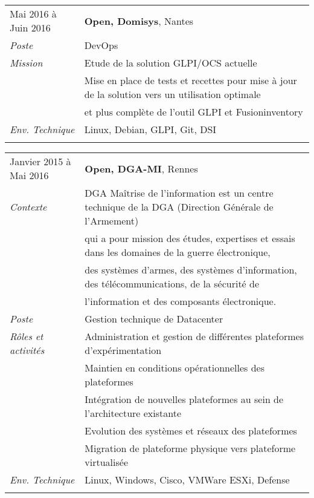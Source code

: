 \documentclass[a4paper]{article}
\begin{document}
\begin{tabular}{P{3.5cm}|p{13cm}}
Mai 2016 à Juin 2016		& \textbf{Open, Domisys}, Nantes\\
\textsl{Poste}			& DevOps\\
\textsl{Mission}		& Etude de la solution GLPI/OCS actuelle\\
				& Mise en place de tests et recettes pour mise à jour de la solution vers un utilisation optimale\\
				& et plus complète de l'outil GLPI et Fusioninventory\\
\textsl{Env. Technique}		& Linux, Debian, GLPI, Git, DSI \\
 & \\
\end{tabular}

\begin{tabular}{P{3.5cm}|p{13cm}}
Janvier 2015 à Mai 2016		& \textbf{Open, DGA-MI}, Rennes\\
\textsl{Contexte}      		& DGA Maîtrise de l'information est un centre technique de la DGA (Direction Générale de l'Armement)\\
				& qui a pour mission des études, expertises et essais dans les domaines de la guerre électronique,\\
				& des systèmes d'armes, des systèmes d'information, des télécommunications, de la sécurité de \\
				& l'information et des composants électronique.\\
\textsl{Poste}			& Gestion technique de Datacenter\\
\textsl{Rôles et activités}	& Administration et gestion de différentes plateformes d'expérimentation\\
				& Maintien en conditions opérationnelles des plateformes\\
				& Intégration de nouvelles plateformes au sein de l'architecture existante\\
				& Evolution des systèmes et réseaux des plateformes\\
				& Migration de plateforme physique vers plateforme virtualisée\\
\textsl{Env. Technique}		& Linux, Windows, Cisco, VMWare ESXi, Defense\\
 & \\
\end{tabular}
\end{document}
